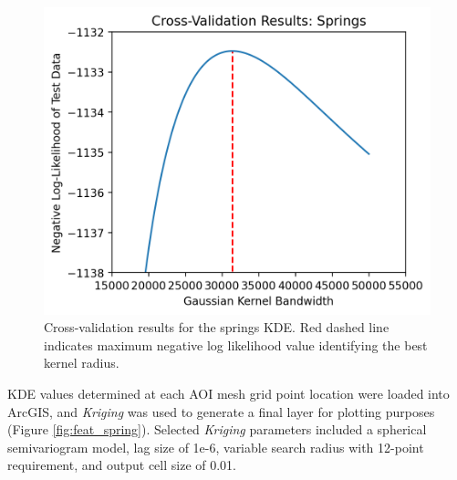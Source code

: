 \begin{figure}[H]
\centering
\includegraphics[scale=.60]{templates/images/Figure-Springs_kde_gridsearchcv_result.png}
\singlespacing
\caption[Spring density parameter tuning]{Cross-validation results for the springs KDE. Red dashed line indicates maximum negative log likelihood value identifying the best kernel radius.}
\label{fig:spring_cv}
\end{figure}

KDE values determined at each AOI mesh grid point location were loaded into ArcGIS, and \textit{Kriging} was used to generate a final layer for plotting purposes (Figure \ref{fig:feat_spring}). Selected \textit{Kriging} parameters included a spherical semivariogram model, lag size of 1e-6, variable search radius with 12-point requirement, and output cell size of 0.01.
\vfill
\pagebreak

